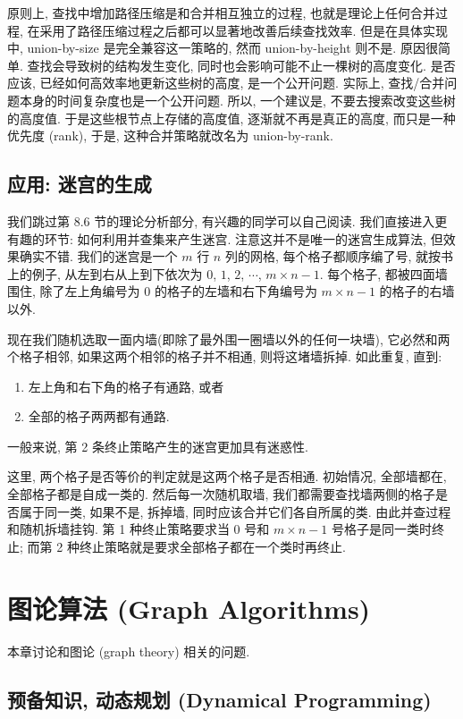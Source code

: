 \documentclass[a4paper]{ctexart}
\theoremstyle{definition}
\theoremstyle{definition}
\begin{document}
原则上, 查找中增加路径压缩是和合并相互独立的过程, 也就是理论上任何合并过程, 
在采用了路径压缩过程之后都可以显著地改善后续查找效率. 但是在具体实现中, 
union-by-size 是完全兼容这一策略的, 然而 union-by-height 则不是. 
原因很简单. 查找会导致树的结构发生变化, 同时也会影响可能不止一棵树的高度变化. 
是否应该, 已经如何高效率地更新这些树的高度, 是一个公开问题. 实际上, 
查找/合并问题本身的时间复杂度也是一个公开问题. 所以, 一个建议是, 不要去搜索改变这些树的高度值. 
于是这些根节点上存储的高度值, 逐渐就不再是真正的高度, 而只是一种优先度 (rank), 
于是, 这种合并策略就改名为 union-by-rank.

\subsection{应用: 迷宫的生成}
我们跳过第 8.6 节的理论分析部分, 有兴趣的同学可以自己阅读. 
我们直接进入更有趣的环节: 如何利用并查集来产生迷宫. 注意这并不是唯一的迷宫生成算法, 
但效果确实不错. 我们的迷宫是一个 $m$ 行 $n$ 列的网格, 每个格子都顺序编了号, 就按书上的例子, 
从左到右从上到下依次为 $0$, $1$, $2$, $\cdots$, $m \times n - 1$. 
每个格子, 都被四面墙围住, 除了左上角编号为 $0$ 的格子的左墙和右下角编号为 $m \times n - 1$ 
的格子的右墙以外. 

现在我们随机选取一面内墙(即除了最外围一圈墙以外的任何一块墙), 它必然和两个格子相邻, 
如果这两个相邻的格子并不相通, 则将这堵墙拆掉. 如此重复, 直到:
\begin{enumerate}
  \item 左上角和右下角的格子有通路, 或者
  \item 全部的格子两两都有通路.
\end{enumerate}

一般来说, 第 2 条终止策略产生的迷宫更加具有迷惑性. 

这里, 两个格子是否等价的判定就是这两个格子是否相通. 
初始情况, 全部墙都在, 全部格子都是自成一类的. 然后每一次随机取墙, 
我们都需要查找墙两侧的格子是否属于同一类, 如果不是, 拆掉墙, 同时应该合并它们各自所属的类. 
由此并查过程和随机拆墙挂钩. 第 1 种终止策略要求当 $0$ 号和 $m \times n - 1$ 号格子是同一类时终止;  
而第 2 种终止策略就是要求全部格子都在一个类时再终止. 


\section{图论算法 (Graph Algorithms)}

本章讨论和图论 (graph theory) 相关的问题. 

\subsection*{预备知识, 动态规划 (Dynamical Programming)}
\end{document}
